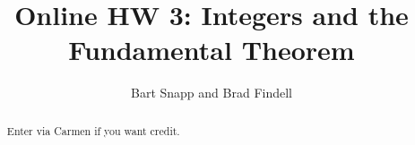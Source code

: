 \documentclass[handout,space,nooutcomes]{xourse}
\title{Online HW 3: Integers and the Fundamental Theorem}
\author{Bart Snapp and Brad Findell}
\begin{document}
\begin{abstract}
Enter via Carmen if you want credit.   
\end{abstract}
\maketitle

{}
\end{document}
